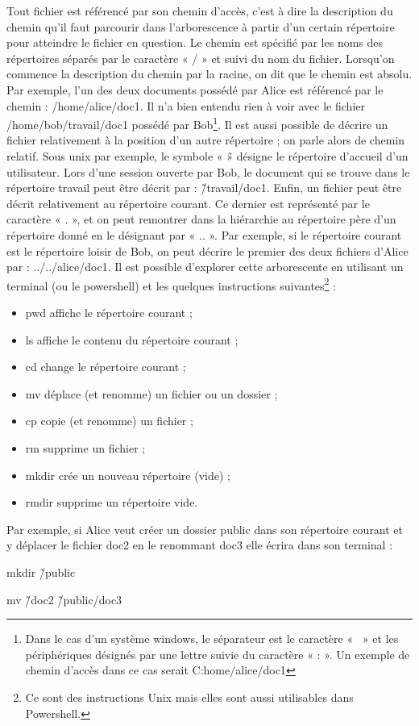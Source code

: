 Tout fichier est référencé par son chemin d’accès, c’est à dire la description du chemin qu’il faut parcourir dans
l’arborescence à partir d’un certain répertoire pour atteindre le fichier en question. Le chemin est spécifié par
les noms des répertoires séparés par le caractère « / » et suivi du nom du fichier.
Lorsqu’on commence la description du chemin par la racine, on dit que le chemin est absolu. Par exemple, l’un
des deux documents possédé par Alice est référencé par le chemin : /home/alice/doc1. Il n’a bien entendu
rien à voir avec le fichier /home/bob/travail/doc1 possédé par Bob\footnote{Dans le cas d’un système windows, le séparateur est le caractère « \ » et les périphériques désignés par une lettre suivie du caractère
« : ». Un exemple de chemin d’accès dans ce cas serait C:home$\slash$alice$\slash$doc1}.
Il est aussi possible de décrire un fichier relativement à la position d’un autre répertoire ; on parle alors de
chemin relatif. Sous unix par exemple, le symbole « \~ » désigne le répertoire d’accueil d’un utilisateur. Lors
d’une session ouverte par Bob, le document qui se trouve dans le répertoire travail peut être décrit par :
\~/travail/doc1. Enfin, un fichier peut être décrit relativement au répertoire courant. Ce dernier est représenté
par le caractère « . », et on peut remontrer dans la hiérarchie au répertoire père d’un répertoire donné en le
désignant par « .. ». Par exemple, si le répertoire courant est le répertoire loisir de Bob, on peut décrire le
premier des deux fichiers d’Alice par : ../../alice/doc1.
Il est possible d’explorer cette arborescente en utilisant un terminal (ou le powershell) et les quelques instructions suivantes\footnote{ Ce sont des instructions Unix mais elles sont aussi utilisables dans Powershell.} :
\begin{itemize}
    \item pwd affiche le répertoire courant ;
    \item ls affiche le contenu du répertoire courant ;
    \item cd change le répertoire courant ;
    \item mv déplace (et renomme) un fichier ou un dossier ;
    \item cp copie (et renomme) un fichier ;
    \item rm supprime un fichier ;
    \item mkdir crée un nouveau répertoire (vide) ;
    \item rmdir supprime un répertoire vide.
\end{itemize}
Par exemple, si Alice veut créer un dossier public dans son répertoire courant et y déplacer le fichier doc2 en
le renommant doc3 elle écrira dans son terminal :
\begin{tcolorbox}[lefttitle=2cm, colframe=gray!75!black, title=Terminal de commandes]
mkdir \~/public

mv \~/doc2 \~/public/doc3
\end{tcolorbox}


